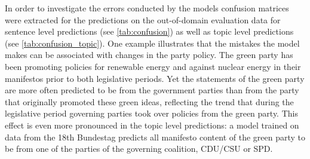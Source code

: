\documentclass{article}
\begin{document}
In order to investigate the errors conducted by the models confusion matrices were extracted for the predictions on the out-of-domain evaluation data for sentence level predictions (see \autoref{tab:confusion}) as well as topic level predictions (see \autoref{tab:confusion_topic}). One example illustrates that the mistakes the model makes can be associated with changes in the party policy. The green party has been promoting policies for renewable energy and against nuclear energy in their manifestos prior to both legislative periods. Yet the statements of the green party are more often predicted to be from the government parties than from the party that originally promoted these green ideas, reflecting the trend that during the legislative period governing parties took over policies from the green party. This effect is even more pronounced in the topic level predictions: a model trained on data from the 18th Bundestag predicts all manifesto content of the green party to be from one of the parties of the governing coalition, CDU/CSU or SPD. \\
\end{document}
